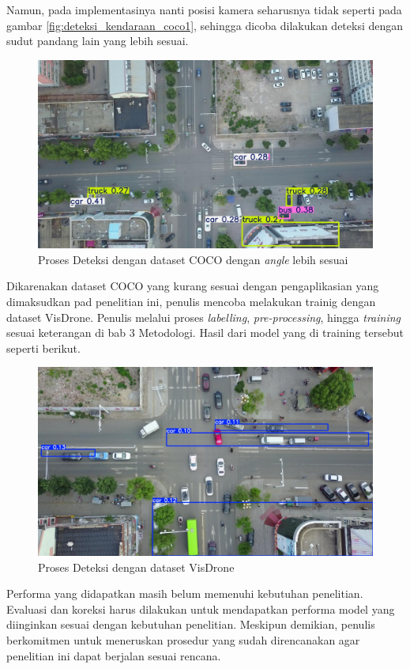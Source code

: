   Namun, pada implementasinya nanti posisi kamera seharusnya tidak seperti pada gambar \ref{fig:deteksi_kendaraan_coco1}, sehingga dicoba dilakukan deteksi dengan sudut pandang lain yang lebih sesuai. 
  \begin{figure} [H] \centering
      \includegraphics[scale=0.3]{gambar/coco_2.jpg}
      \caption{Proses Deteksi dengan dataset COCO dengan \emph{angle} lebih sesuai}
      \label{fig:deteksi_kendaraan_coco2}
    \end{figure}
    
Dikarenakan dataset COCO yang kurang sesuai dengan pengaplikasian yang dimaksudkan pad penelitian ini, penulis mencoba melakukan trainig dengan dataset VisDrone. Penulis melalui proses \emph{labelling}, \emph{pre-processing}, hingga \emph{training} sesuai keterangan di bab 3 Metodologi. Hasil dari model yang di training tersebut seperti berikut.
\begin{figure} [H] \centering
    \includegraphics[scale=0.2]{gambar/custom_model.jpg}
    \caption{Proses Deteksi dengan dataset VisDrone}
    \label{fig:deteksi_kendaraan_visdrone}
    \end{figure}

Performa yang didapatkan masih belum memenuhi kebutuhan penelitian. Evaluasi dan koreksi harus dilakukan untuk mendapatkan performa model yang diinginkan sesuai dengan kebutuhan penelitian. Meskipun demikian, penulis berkomitmen untuk meneruskan prosedur yang sudah direncanakan agar penelitian ini dapat berjalan sesuai rencana.